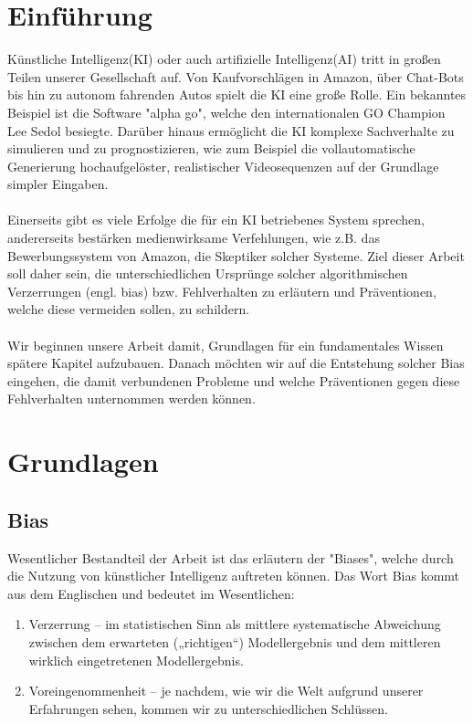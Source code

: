 \documentclass[12pt,oneside,a4paper,parskip]{scrbook}
\begin{document}
\chapter{Einführung}
\label{chapter:intro}
Künstliche Intelligenz(KI) oder auch artifizielle Intelligenz(AI) tritt in großen Teilen unserer Gesellschaft auf. Von Kaufvorschlägen in Amazon, über Chat-Bots bis hin zu autonom fahrenden Autos spielt die KI eine große Rolle. Ein bekanntes Beispiel ist die Software "alpha go", welche den internationalen GO Champion Lee Sedol besiegte\cite{alphaGo}. Darüber hinaus ermöglicht die KI komplexe Sachverhalte zu simulieren und zu prognostizieren, wie zum Beispiel die vollautomatische Generierung hochaufgelöster, realistischer Videosequenzen auf der Grundlage simpler Eingaben\cite{videoToVideo}.
\\\\
Einerseits gibt es viele Erfolge die für ein KI betriebenes System sprechen, andererseits bestärken medienwirksame Verfehlungen, wie z.B. das Bewerbungssystem von Amazon\cite{amazon}, die Skeptiker solcher Systeme. Ziel dieser Arbeit soll daher sein, die unterschiedlichen Ursprünge solcher algorithmischen Verzerrungen (engl. bias) bzw. Fehlverhalten zu erläutern und Präventionen, welche diese vermeiden sollen, zu schildern.
\\\\
Wir beginnen unsere Arbeit damit, Grundlagen für ein fundamentales Wissen spätere Kapitel aufzubauen. Danach möchten wir auf die Entstehung solcher Bias eingehen, die damit verbundenen Probleme und welche Präventionen gegen diese Fehlverhalten unternommen werden können.

\chapter{Grundlagen}
\section{Bias}
Wesentlicher Bestandteil der Arbeit ist das erläutern der "Biases", welche durch die Nutzung von künstlicher Intelligenz auftreten können. Das Wort Bias kommt aus dem Englischen und bedeutet im Wesentlichen:

\begin{enumerate}
	\item Verzerrung – im statistischen Sinn als mittlere systematische Abweichung zwischen dem erwarteten („richtigen“) Modellergebnis und dem mittleren wirklich eingetretenen Modellergebnis.
	\item Voreingenommenheit – je nachdem, wie wir die Welt aufgrund unserer Erfahrungen sehen, kommen wir zu unterschiedlichen Schlüssen.
\end{enumerate}
\end{document}
